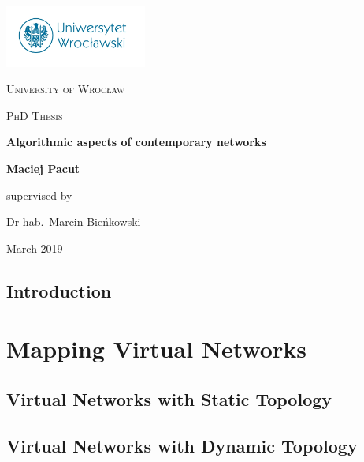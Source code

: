 \documentclass[a4paper,11pt]{book}
\author{Maciej Pacut}
\begin{document}
\begin{titlepage}
	\centering
	\includegraphics[width=0.35\textwidth]{figs/uni-logo.jpg}\par\vspace{1cm}
	{\scshape\LARGE University of Wrocław\par}
	\vspace{3cm}
        {\scshape\Large PhD Thesis\par}
	\vspace{1cm}
        {\huge\bfseries Algorithmic aspects of contemporary networks\par}
	\vspace{3cm}
        {\huge \bfseries Maciej Pacut\par}
	\vfill
	supervised by\par
	Dr hab.~Marcin Bieńkowski

	\vfill

	{\large March 2019 \par}
\end{titlepage}

\newpage
\thispagestyle{empty}
\mbox{}

\tableofcontents


\chapter{Introduction}



\part{Mapping Virtual Networks}
\label{pt:virtual-networks}

\chapter{Virtual Networks with Static Topology}
\label{ch:static-mapping}



\chapter{Virtual Networks with Dynamic Topology}
\label{ch:dynamic-mapping}
\end{document}
